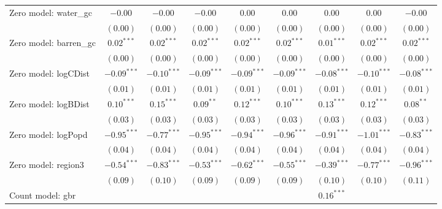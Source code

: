 \begin{sidewaystable}
\begin{center}
{\begin{tabular}{l c c c c c c c c}
Zero model: water\_gc          & $-0.00$       & $-0.00$       & $-0.00$        & $0.00$        & $0.00$         & $0.00$        & $0.00$          & $-0.00$         \\
                               & $(0.00)$      & $(0.00)$      & $(0.00)$       & $(0.00)$      & $(0.00)$       & $(0.00)$      & $(0.00)$        & $(0.00)$        \\
Zero model: barren\_gc         & $0.02^{***}$  & $0.02^{***}$  & $0.02^{***}$   & $0.02^{***}$  & $0.02^{***}$   & $0.01^{***}$  & $0.02^{***}$    & $0.02^{***}$    \\
                               & $(0.00)$      & $(0.00)$      & $(0.00)$       & $(0.00)$      & $(0.00)$       & $(0.00)$      & $(0.00)$        & $(0.00)$        \\
Zero model: logCDist           & $-0.09^{***}$ & $-0.10^{***}$ & $-0.09^{***}$  & $-0.09^{***}$ & $-0.09^{***}$  & $-0.08^{***}$ & $-0.10^{***}$   & $-0.08^{***}$   \\
                               & $(0.01)$      & $(0.01)$      & $(0.01)$       & $(0.01)$      & $(0.01)$       & $(0.01)$      & $(0.01)$        & $(0.01)$        \\
Zero model: logBDist           & $0.10^{***}$  & $0.15^{***}$  & $0.09^{**}$    & $0.12^{***}$  & $0.10^{***}$   & $0.13^{***}$  & $0.12^{***}$    & $0.08^{**}$     \\
                               & $(0.03)$      & $(0.03)$      & $(0.03)$       & $(0.03)$      & $(0.03)$       & $(0.03)$      & $(0.03)$        & $(0.03)$        \\
Zero model: logPopd            & $-0.95^{***}$ & $-0.77^{***}$ & $-0.95^{***}$  & $-0.94^{***}$ & $-0.96^{***}$  & $-0.91^{***}$ & $-1.01^{***}$   & $-0.83^{***}$   \\
                               & $(0.04)$      & $(0.04)$      & $(0.04)$       & $(0.04)$      & $(0.04)$       & $(0.04)$      & $(0.04)$        & $(0.04)$        \\
Zero model: region3            & $-0.54^{***}$ & $-0.83^{***}$ & $-0.53^{***}$  & $-0.62^{***}$ & $-0.55^{***}$  & $-0.39^{***}$ & $-0.77^{***}$   & $-0.96^{***}$   \\
                               & $(0.09)$      & $(0.10)$      & $(0.09)$       & $(0.09)$      & $(0.09)$       & $(0.10)$      & $(0.10)$        & $(0.11)$        \\
Count model: gbr               &               &               &                &               &                & $0.16^{***}$  &                 &                 \\

\end{tabular}}
\end{center}
\end{sidewaystable}
